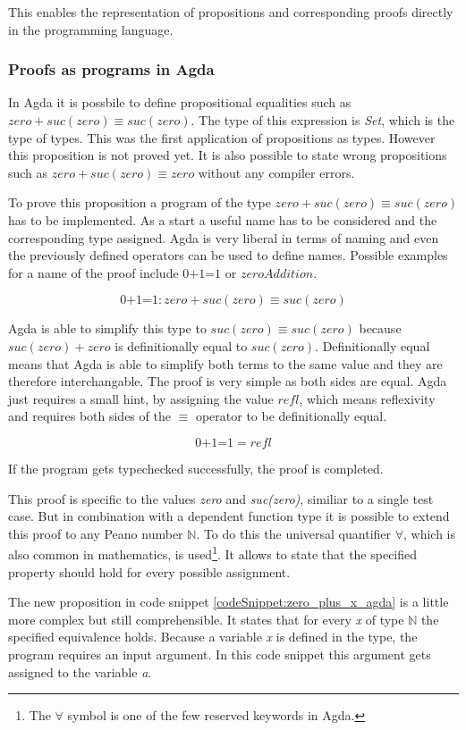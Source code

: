 This enables the representation of propositions and corresponding proofs directly in the programming language.

\subsubsection{Proofs as programs in Agda}
In Agda it is possbile to define propositional equalities such as $zero + suc(zero) \equiv suc(zero)$. The type of this expression is \emph{Set}, which is the type of types.
This was the first application of propositions as types.
However this proposition is not proved yet.
It is also possible to state wrong propositions such as $zero + suc(zero) \equiv zero$ without any compiler errors.

To prove this proposition a program of the type $zero + suc(zero) \equiv suc(zero)$ has to be implemented.
As a start a useful name has to be considered and the corresponding type assigned.
Agda is very liberal in terms of naming and even the previously defined operators can be used to define names.
Possible examples for a name of the proof include $\text{0+1=1}$ or $zeroAddition$.

$$\text{0+1=1} : zero + suc(zero) \equiv suc(zero)$$

Agda is able to simplify this type to $suc(zero) \equiv suc(zero)$ because $suc(zero) + zero$ is definitionally equal to $suc(zero)$. Definitionally equal means that Agda is able to simplify both terms to the same value and they are therefore interchangable.
The proof is very simple as both sides are equal. 
Agda just requires a small hint, by assigning the value $refl$, which means reflexivity and requires both sides of the $\equiv$ operator to be definitionally equal.

$$\text{0+1=1} = refl$$

If the program gets typechecked successfully, the proof is completed.

This proof is specific to the values \emph{zero} and \emph{suc(zero)}, similiar to a single test case.
But in combination with a dependent function type it is possible to extend this proof to any Peano number $\mathbb{N}$. 
To do this the universal quantifier $\forall$, which is also common in mathematics, is used\footnote{The $\forall$ symbol is one of the few reserved keywords in Agda.}.
It allows to state that the specified property should hold for every possible assignment\cite{plfa2019}.

The new proposition in code snippet \ref{codeSnippet:zero_plus_x_agda} is a little more complex but still comprehensible. 
It states that for every \emph{x} of type $\mathbb{N}$ the specified equivalence holds. 
Because a variable \emph{x} is defined in the type, the program requires an input argument.
In this code snippet this argument gets assigned to the variable \emph{a}.

